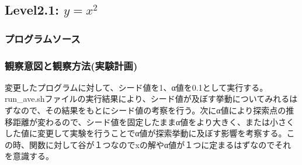 \subsection{Level2.1: $y=x^2$}
\subsubsection{プログラムソース}


\subsubsection{観察意図と観察方法(実験計画)}
変更したプログラムに対して、シード値を1、α値を0.1として実行する。run\_ave.shファイルの実行結果により、シード値が及ぼす挙動についてみれるはずなので、その結果をもとにシード値の考察を行う。次にα値により探索点の推移距離が変わるので、シード値を固定したままα値をより大きく、または小さくした値に変更して実験を行うことでα値が探索挙動に及ぼす影響を考察する。この時、関数に対して谷が１つなのでxの解やα値が１つに定まるはずなのでそれを意識する。
